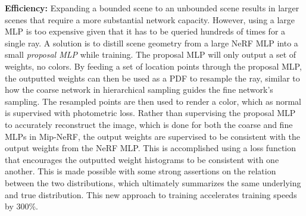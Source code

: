 \textbf{Efficiency:}
Expanding a bounded scene to an unbounded scene results in larger scenes that require a more substantial network capacity. However, using a large MLP is too expensive given that it has to be queried hundreds of times for a single ray. A solution is to distill scene geometry from a large NeRF MLP into a small \textit{proposal MLP} while training. The proposal MLP will only output a set of weights, no colors. By feeding a set of location points through the proposal MLP, the outputted weights can then be used as a PDF to resample the ray, similar to how the coarse network in hierarchical sampling guides the fine network's sampling. The resampled points are then used to render a color, which as normal is supervised with photometric loss. Rather than supervising the proposal MLP to accurately reconstruct the image, which is done for both the coarse and fine MLPs in Mip-NeRF, the output weights are supervised to be consistent with the output weights from the NeRF MLP. This is accomplished using a loss function that encourages the outputted weight histograms to be consistent with one another. This is made possible with some strong assertions on the relation between the two distributions, which ultimately summarizes the same underlying and true distribution. This new approach to training accelerates training speeds by 300\%.




